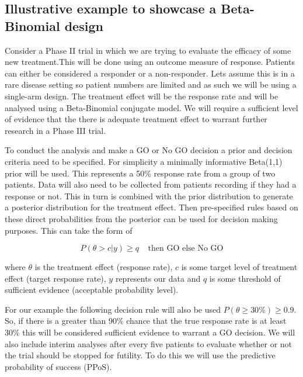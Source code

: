 
\subsection{Illustrative example to showcase a Beta-Binomial design} 
\label{etp:BBIllEx}

Consider a Phase \RN{2} trial in which we are trying to evaluate the efficacy of some new treatment.This will be done using an outcome measure of response. Patients can either be considered a responder or a non-responder. Lets assume this is in a rare disease setting so patient numbers are limited and as such we will be using a single-arm design. The treatment effect will be the response rate and will be analysed using a Beta-Binomial conjugate model. We will require a sufficient level of evidence that the there is adequate treatment effect to warrant further research in a Phase \RN{3} trial.

To conduct the analysis and make a GO or No GO decision a prior and decision criteria need to be specified. For simplicity a minimally informative Beta(1,1) prior will be used. This represents a 50\% response rate from a group of two patients. Data will also need to be collected from patients recording if they had a response or not. This in turn is combined with the prior distribution to generate a posterior distribution for the treatment effect. Then pre-specified rules based on these direct probabilities from the posterior can be used for decision making purposes. This can take the form of

\begin{equation}
	\label{eq_etp:betafinaldecrule}
	P(\theta > c |y) \geq q  \; \; \; \; \text{then GO else No GO}
\end{equation}

where $\theta$ is the treatment effect (response rate), $c$ is some target level of treatment effect (target response rate), $y$ represents our data and $q$ is some threshold of sufficient evidence (acceptable probability level). 
 
For our example the following decision rule will also be used $P(\theta  \geq 30\%) \geq 0.9$. So, if there is a greater than  90\% chance that the true response rate is at least 30\% this will be considered sufficient evidence to warrant a GO decision. We will also include interim analyses after every five patients to evaluate whether or not the trial should be stopped for futility. To do this we will use the predictive probability of success (PPoS).

